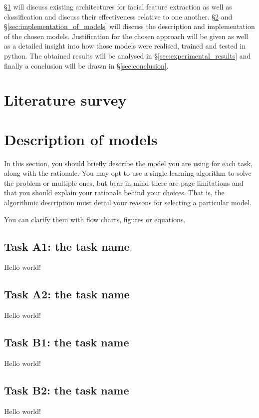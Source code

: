 \documentclass{article}
\begin{document}
    \S \ref{sec:literature_survey} will discuss existing architectures for facial feature extraction as well as classification and discuss their effectiveness relative to one another. \S \ref{sec:description_of_models} and \S \ref{sec:implementation_of_models} will discuss the description and implementation of the chosen models. Justification for the chosen approach will be given as well as a detailed insight into how those models were realised, trained and tested in python. The obtained results will be analysed in \S \ref{sec:experimental_results} and finally a conclusion will be drawn in \S \ref{sec:conclusion}.

\section{Literature survey}
\label{sec:literature_survey}
    


\section{Description of models}
\label{sec:description_of_models}
    In this section, you should briefly describe the model you are using for each task, along with the rationale. You may opt to use a single learning algorithm to solve the problem or multiple ones, but bear in mind there are page limitations and that you should explain your rationale behind your choices. That is, the algorithmic description must detail your reasons for selecting a particular model.
    
    You can clarify them with flow charts, figures or equations.
    
    \subsection{Task A1: the task name}
    \label{ssec:models_A1}
    Hello world!
    \subsection{Task A2: the task name}
    \label{ssec:models_A1}
    Hello world!
    \subsection{Task B1: the task name}
    \label{ssec:models_A1}
    Hello world!
    \subsection{Task B2: the task name}
    \label{ssec:models_A1}
    Hello world!
\end{document}
